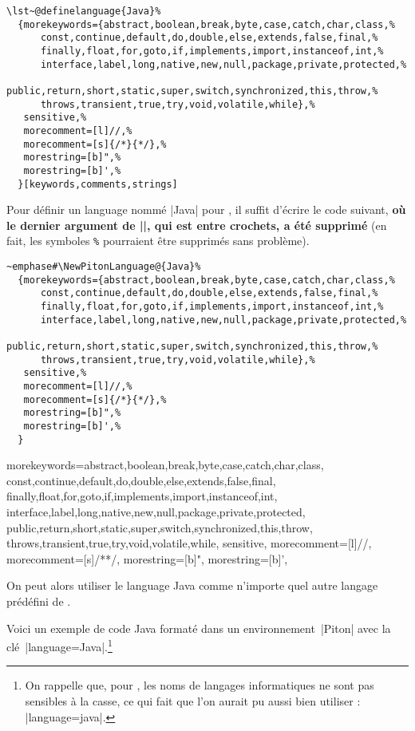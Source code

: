 \documentclass[dvipsnames,svgnames]{article}
\begin{document}
\begin{Verbatim}[formatcom=\small\color{gray}]
\lst~@definelanguage{Java}%
  {morekeywords={abstract,boolean,break,byte,case,catch,char,class,%
      const,continue,default,do,double,else,extends,false,final,%
      finally,float,for,goto,if,implements,import,instanceof,int,%
      interface,label,long,native,new,null,package,private,protected,%
      public,return,short,static,super,switch,synchronized,this,throw,%
      throws,transient,true,try,void,volatile,while},%
   sensitive,%
   morecomment=[l]//,%
   morecomment=[s]{/*}{*/},%
   morestring=[b]",%
   morestring=[b]',%
  }[keywords,comments,strings]
\end{Verbatim}

\medskip
Pour définir un language nommé |Java| pour , il suffit d'écrire le code suivant, 
{\bfseries où le dernier argument de |\lst@definelanguage|, qui est entre crochets, a été supprimé} 
(en fait, les symboles \verb+%+ pourraient être supprimés sans problème).

\begin{Verbatim}[formatcom=\small\color{gray}]
~emphase#\NewPitonLanguage@{Java}%
  {morekeywords={abstract,boolean,break,byte,case,catch,char,class,%
      const,continue,default,do,double,else,extends,false,final,%
      finally,float,for,goto,if,implements,import,instanceof,int,%
      interface,label,long,native,new,null,package,private,protected,%
      public,return,short,static,super,switch,synchronized,this,throw,%
      throws,transient,true,try,void,volatile,while},%
   sensitive,%
   morecomment=[l]//,%
   morecomment=[s]{/*}{*/},%
   morestring=[b]",%
   morestring=[b]',%
  }
\end{Verbatim}


  {morekeywords={abstract,boolean,break,byte,case,catch,char,class,
      const,continue,default,do,double,else,extends,false,final,
      finally,float,for,goto,if,implements,import,instanceof,int,
      interface,label,long,native,new,null,package,private,protected,
      public,return,short,static,super,switch,synchronized,this,throw,
      throws,transient,true,try,void,volatile,while},
   sensitive,
   morecomment=[l]//,
   morecomment=[s]{/*}{*/},
   morestring=[b]",
   morestring=[b]',
  }


\medskip
On peut alors utiliser le language Java comme n'importe quel autre langage prédéfini de . 

Voici un exemple de code Java formaté dans un environnement~|{Piton}| avec la clé~|language=Java|.\footnote{On
  rappelle que, pour , les noms de langages informatiques ne sont pas sensibles à la casse, ce qui fait
  que l'on aurait pu aussi bien utiliser : |language=java|.}
\end{document}

